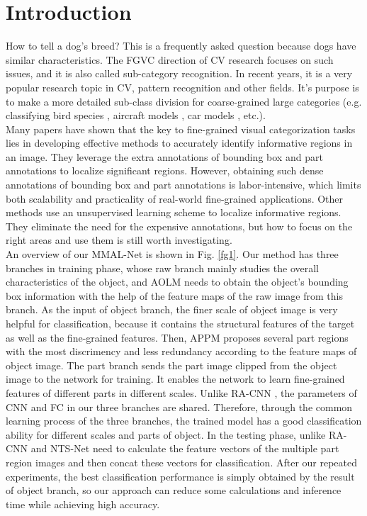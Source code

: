 \documentclass[runningheads]{llncs}
\begin{document}
\section{Introduction}
How to tell a dog's breed? This is a frequently asked question because dogs have similar characteristics. The FGVC direction of CV research focuses on such issues, and it is also called sub-category recognition. In recent years, it is a very popular research topic in CV, pattern recognition and other fields. It's purpose is to make a more detailed sub-class division for coarse-grained large categories (e.g. classifying bird species \cite{WahCUB_200_2011}, aircraft models \cite{maji2013fine}, car models \cite{KrauseStarkDengFei-Fei_3DRR2013}, etc.).\\
\indent Many papers \cite{lin2015bilinear,zhang2016spda,wei2016mask,lam2017fine} have shown that  the key to fine-grained visual categorization tasks lies in developing effective methods to accurately identify informative regions in an image. They leverage the extra annotations of bounding box and part annotations to localize significant regions. However, obtaining such dense annotations of bounding box and part annotations is labor-intensive, which limits both scalability and practicality of real-world fine-grained applications. Other methods \cite{zhao2017diversified,zheng2017learning,yang2018learning,zheng2019looking} use an unsupervised learning scheme to localize informative regions. They eliminate the need for the expensive annotations, but how to focus on the right areas and use them is still worth investigating.\\
\indent An overview of our MMAL-Net is shown in Fig. \ref{fg1}. Our method has three branches in training phase,  whose raw branch mainly studies the overall characteristics of the object, and AOLM needs to obtain the object's bounding box information with the help of the feature maps of the raw image from this branch. As the input of object branch, the finer scale of object image is very helpful for classification, because it contains the structural features of the target as well as the fine-grained features. Then, APPM proposes several part regions with the most discrimency and less redundancy according to the feature maps of object image. The part branch sends the part image clipped from the object image to the network for training. It enables the network to learn fine-grained features of different parts in different scales. Unlike RA-CNN \cite{fu2017look}, the parameters of CNN and FC in our three branches are shared. Therefore, through the common learning process of the three branches, the trained model has a good classification ability for different scales and parts of object. In the testing phase, unlike RA-CNN \cite{fu2017look} and NTS-Net \cite{yang2018learning} need to calculate the feature vectors of the multiple part region images and then concat these vectors for classification. After our repeated experiments, the best classification performance is simply obtained by the result of object branch, so our approach can reduce some calculations and inference time while achieving high accuracy.\\
\end{document}
